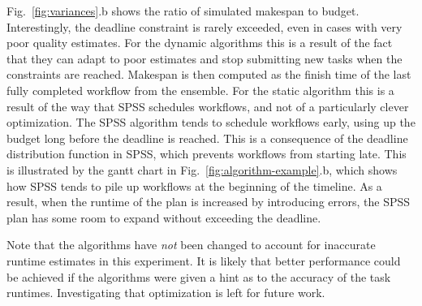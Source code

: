 \documentclass[conference]{IEEEtran}
\begin{document}
Fig.~\ref{fig:variances}.b shows the ratio of simulated makespan to budget.
Interestingly, the deadline constraint is rarely exceeded, even in cases with
very poor quality estimates. For the dynamic algorithms this is a result of the
fact that they can adapt to poor estimates and stop submitting new tasks when
the constraints are reached. Makespan is then computed as the finish time of the
last fully completed workflow from the ensemble. For the static algorithm this
is a result of the way that SPSS schedules workflows, and not of a particularly
clever optimization. The SPSS algorithm tends to schedule workflows early, using
up the budget long before the deadline is reached. This is a consequence of the
deadline distribution function in SPSS, which prevents workflows from starting
late. This is illustrated by the gantt chart in
Fig.~\ref{fig:algorithm-example}.b, which shows how SPSS tends to pile up
workflows at the beginning of the timeline.
As a result, when the runtime of the plan is increased by introducing errors,
the SPSS plan has some room to expand without exceeding the deadline.

Note that the algorithms have \textit{not} been changed to account for
inaccurate runtime estimates in this experiment. It is likely that better
performance could be achieved if the algorithms were given a hint as to the
accuracy of the task runtimes. Investigating that optimization is left for
future work. 

\end{document}
